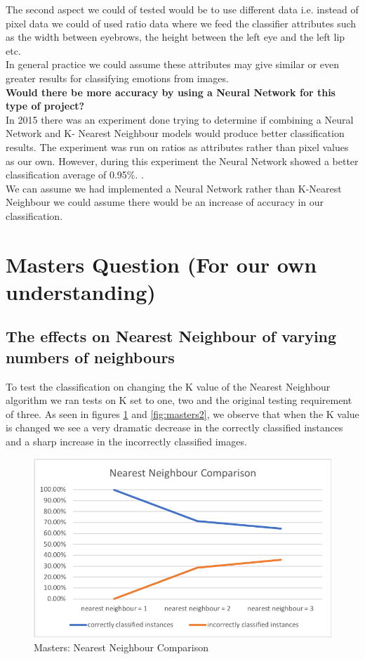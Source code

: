 \documentclass[12pt]{article}
\begin{document}
The second aspect we could of tested would be to use different data i.e. instead of pixel data we could of used ratio data where we feed the classifier attributes such as the width between eyebrows, the height between the left eye and the left lip etc.\\ 

In general practice we could assume these attributes may give similar or even greater results for classifying emotions from images.\\

\textbf{Would there be more accuracy by using a Neural Network for this type of project?}\\

In 2015 there was an experiment done trying to determine if combining a Neural Network and K- Nearest Neighbour models would produce better classification results. The experiment was run on ratios as attributes rather than pixel values as our own. However, during this experiment the Neural Network showed a better classification average of 0.95\%. \cite{hai_2015}.\\

We can assume we had implemented a Neural Network rather than K-Nearest Neighbour we could assume there would be an increase of accuracy in our classification.\\


\section{Masters Question (For our own understanding)}

\subsection{The effects on Nearest Neighbour of varying numbers of neighbours}

To test the classification on changing the K value of the Nearest Neighbour algorithm we ran tests on K set to one, two and the original testing requirement of three. As seen in figures \ref{fig:masters1} and \ref{fig:masters2}, we observe that when the K value is changed we see a very dramatic decrease in the correctly classified instances and a sharp increase in the incorrectly classified images.\\

\begin{figure}[H]
	\centering
	\includegraphics[width=0.7\linewidth]{images/masters1}
	\caption{Masters: Nearest Neighbour Comparison}
	\label{fig:masters1}
\end{figure}
\end{document}
